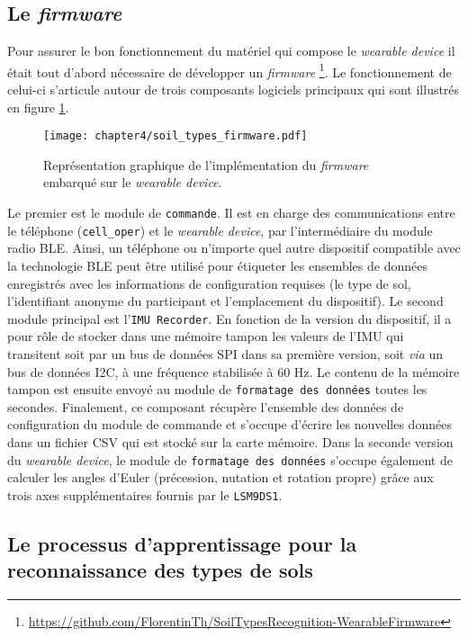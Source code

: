 \subsection{Le \textit{firmware}}

Pour assurer le bon fonctionnement du matériel qui compose le \textit{wearable device} il était tout d'abord nécessaire de développer un \textit{firmware} \footnote{\url{https://github.com/FlorentinTh/SoilTypesRecognition-WearableFirmware}}. Le fonctionnement de celui-ci s'articule autour de trois composants logiciels principaux qui sont illustrés en figure \ref{fig:soil_types_firmware}.

\begin{figure}[t]
	\centering
	\texttt{[image: chapter4/soil\_types\_firmware.pdf]}
        \caption{Représentation graphique de l'implémentation du \textit{firmware} embarqué sur le \textit{wearable device}.}
	\label{fig:soil_types_firmware}
\end{figure}

Le premier est le module de \texttt{commande}. Il est en charge des communications entre le téléphone (\texttt{cell\_oper}) et le \textit{wearable device}, par l'intermédiaire du module radio \acs{BLE}. Ainsi, un téléphone ou n'importe quel autre dispositif compatible avec la technologie \acs{BLE} peut être utilisé pour étiqueter les ensembles de données enregistrés avec les informations de configuration requises (le type de sol, l'identifiant anonyme du participant et l'emplacement du dispositif). Le second module principal est l'\texttt{\acs{IMU} Recorder}. En fonction de la version du dispositif, il a pour rôle de stocker dans une mémoire tampon les valeurs de l'\acs{IMU} qui transitent soit par un bus de données \ac{SPI} dans sa première version, soit \textit{via} un bus de données \ac{I2C}, à une fréquence stabilisée à 60 Hz. Le contenu de la mémoire tampon est ensuite envoyé au module de \texttt{formatage des données} toutes les secondes. Finalement, ce composant récupère l'ensemble des données de configuration du module de commande et s'occupe d'écrire les nouvelles données dans un fichier \ac{CSV} qui est stocké sur la carte mémoire. Dans la seconde version du \textit{wearable device}, le module de \texttt{formatage des données} s'occupe également de calculer les angles d'Euler (précession, nutation et rotation propre) grâce aux trois axes supplémentaires fournis par le \texttt{LSM9DS1}.

\subsection{Le processus d'apprentissage pour la reconnaissance des types de sols}
\label{sec:learn}

